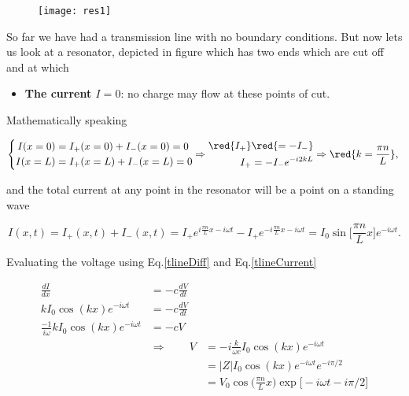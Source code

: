 \begin{figure}[h]
  \centering%
  \texttt{[image: res1]}%
  \caption{\label{tlineres1}}
\end{figure}

So   far  we   have  had   a  transmission   line  with   no  boundary
conditions. But  now lets us look  at a resonator, depicted  in figure
which has two ends which are cut off and at which

\begin{itemize}
\item \textbf{The current $ I=0 $}: no charge may flow at these points
  of cut.
\end{itemize}

Mathematically speaking

 \begin{equation}
   \left\lbrace \begin{aligned}
       I(x=0) & = I_{+}(x=0)+I_-(x=0)=0\\
       I(x=L) & = I_{+}(x=L)+I_-(x=L)=0
     \end{aligned}\Rightarrow\begin{aligned}
       \red{I_+}&\red{=-I_-}\\
       I_+&= -I_-e^{-i2kL}
     \end{aligned} \Rightarrow \red{k=\frac{\pi n}{L}}, \right.
 \end{equation}

 \noindent and the total current at any point in the resonator will be
 a point on a standing wave

 \begin{equation}
   I(x,t) = I_+(x,t) + I_-(x,t) = I_+e^{i\frac{\pi n}{L}x-i\omega t} - I_+e^{-i\frac{\pi n}{L}x-i\omega t} = {{I_0\sin\bigg[\frac{\pi n}{L}x\bigg]e^{-i\omega t}}}.
   \label{tlineCurrent}
 \end{equation}

 \noindent  Evaluating  the  voltage  using  Eq.\eqref{tlineDiff}  and
 Eq.\eqref{tlineCurrent}

 \begin{equation}
   \begin{aligned}
     \frac{dI}{dx} &= - c\frac{dV}{dt}\\
     kI_0\cos(kx)e^{-i\omega t}& =-c\frac{dV}{dt}\\
     \frac{-1}{i\omega}kI_0\cos(kx)e^{-i\omega t}& =-cV\\
     & \Rightarrow\qquad V &=  -i\frac{k}{\omega c}I_0\cos(kx)e^{-i\omega t}\\
     &&=|Z|I_0\cos(kx)e^{-i\omega t}e^{-i\pi/2}\\
     &&=V_0\cos \bigg(\frac{\pi n}{L}x\bigg)\exp\bigg[-i\omega t-i\pi/2\bigg]\\
   \end{aligned}
 \end{equation}

